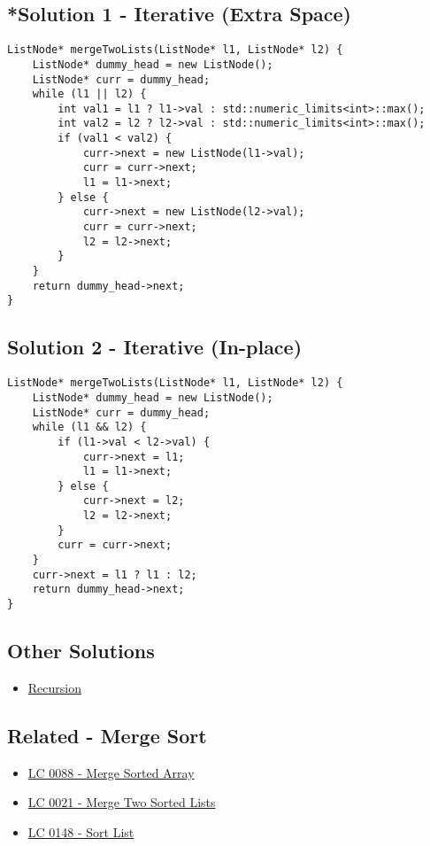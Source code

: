 \subsection*{*Solution 1 - Iterative (Extra Space)}\label{solution:lc0021_iterative1}
\begin{lstlisting}
ListNode* mergeTwoLists(ListNode* l1, ListNode* l2) {
	ListNode* dummy_head = new ListNode();
	ListNode* curr = dummy_head;
	while (l1 || l2) {
		int val1 = l1 ? l1->val : std::numeric_limits<int>::max();
		int val2 = l2 ? l2->val : std::numeric_limits<int>::max();
		if (val1 < val2) {
			curr->next = new ListNode(l1->val);
			curr = curr->next;
			l1 = l1->next;
		} else {
			curr->next = new ListNode(l2->val);
			curr = curr->next;
			l2 = l2->next;
		}
	}
	return dummy_head->next;
}
\end{lstlisting}

\subsection*{Solution 2 - Iterative (In-place)}\label{solution:lc0021_iterative2}
\begin{lstlisting}
ListNode* mergeTwoLists(ListNode* l1, ListNode* l2) {
	ListNode* dummy_head = new ListNode();
	ListNode* curr = dummy_head;
	while (l1 && l2) {
		if (l1->val < l2->val) {
			curr->next = l1;
			l1 = l1->next;
		} else {
			curr->next = l2;
			l2 = l2->next;
		}
		curr = curr->next;
	}
	curr->next = l1 ? l1 : l2;
	return dummy_head->next;
}
\end{lstlisting}

\subsection*{Other Solutions}
\begin{itemize}
\item \hyperref[solution:lc0021_recursion]{Recursion}
\end{itemize}

\subsection*{Related - Merge Sort}
\begin{itemize}
\item \hyperref[lc0088]{LC 0088 - Merge Sorted Array}
\item \hyperref[lc0021]{LC 0021 - Merge Two Sorted Lists}
\item \hyperref[lc0148]{LC 0148 - Sort List}
\end{itemize}

